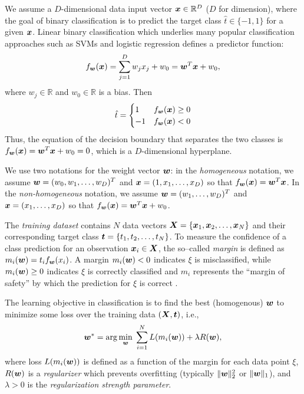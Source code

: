 \ENDCOMMENT

We assume a $D$-dimensional data input vector $\boldsymbol{x} \in \mathbb{R}^D$ ($D$ for
dimension), where the goal of binary classification is to predict the
target class $\hat{t} \in \{ -1, 1 \}$ for a given $\boldsymbol{x}$.  Linear
binary classification which underlies many popular classification
approaches such as SVMs and logistic regression defines a predictor
function:
\begin{equation} 
\label{eq:predictor}
f_{\boldsymbol{w}}(\boldsymbol{x}) = \sum_{j=1}^D w_j x_j + w_0 = \boldsymbol{w}^T \boldsymbol{x} + w_0,
\end{equation}
where $w_j \in \mathbb{R}$ and $w_0 \in \mathbb{R}$ is a bias.  Then
\begin{equation}
\hat{t} = 
  \begin{cases}
  1  & f_{\boldsymbol{w}}(\boldsymbol{x}) \geq 0\\
  -1 & f_{\boldsymbol{w}}(\boldsymbol{x}) <    0
  \end{cases}
\end{equation}
Thus, the equation of the decision boundary that separates the two
classes is $f_{\boldsymbol{w}}(\boldsymbol{x}) = \boldsymbol{w}^T \boldsymbol{x} + w_0 = 0$, which is a
$D$-dimensional hyperplane.

We use two notations for the weight vector $\boldsymbol{w}$: in the
\emph{homogeneous} notation, we assume $\boldsymbol{w} = (w_0,w_1,\ldots,w_D)^T$
and $\boldsymbol{x} = (1,x_1,\ldots,x_D)$ so that $f_{\boldsymbol{w}}(\boldsymbol{x}) = \boldsymbol{w}^T \boldsymbol{x}$.  In the
\emph{non-homogeneous} notation, we assume $\boldsymbol{w} = (w_1,\ldots,w_D)^T$
and $\boldsymbol{x} = (x_1,\ldots,x_D)$ so that $f_{\boldsymbol{w}}(\boldsymbol{x}) = \boldsymbol{w}^T \boldsymbol{x} + w_0$.

The \emph{training dataset} contains $N$ data vectors $\boldsymbol{X} =
\{\boldsymbol{x}_1, \boldsymbol{x}_2, \dots, \boldsymbol{x}_N\}$ and their corresponding target
class $\boldsymbol{t} = \{t_1, t_2, \dots, t_N\}$. To measure the confidence of a
class prediction for an observation $\boldsymbol{x}_i \in \boldsymbol{X}$, the so--called
\emph{margin} is defined as $m_i(\boldsymbol{w}) = t_i f_{\boldsymbol{w}}(x_i)$.  A margin
$m_i(\boldsymbol{w}) < 0$ indicates $\xi$ is misclassified, while $m_i(\boldsymbol{w}) \geq 0$
indicates $\xi$ is correctly classified and $m_i$ represents the
``margin of safety'' by which the prediction for $\xi$ is correct
\cite{McAllester}.

The learning objective in classification is to find the best
(homogenous) $\boldsymbol{w}$ to minimize some loss over the training data
$(\boldsymbol{X},\boldsymbol{t})$, i.e.,
\begin{equation}
\label{eq:objective}
 \boldsymbol{w}^* = \arg\min_{\boldsymbol{w}} \; \sum_{i=1}^{N} L(m_i(\boldsymbol{w})) + \lambda R(\boldsymbol{w}),
\end{equation}
where loss $L(m_i(\boldsymbol{w}))$ is defined as a function of the margin for
each data point $\xi$, $R(\boldsymbol{w})$ is a \emph{regularizer} which
prevents overfitting (typically $\|\boldsymbol{w}\|_2^2$ or $\|\boldsymbol{w}\|_1$), and
$\lambda > 0$ is the \emph{regularization strength parameter}.


